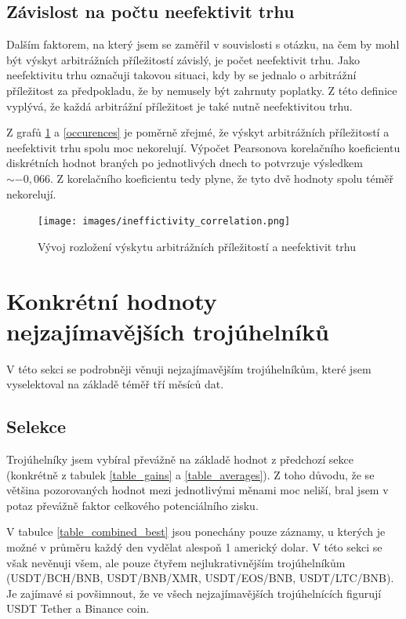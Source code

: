 \documentclass[thesis=B,czech]{FITthesis}[2019/03/21]
\begin{document}
\subsection{Závislost na počtu neefektivit trhu}
Dalším faktorem, na který jsem se zaměřil v souvislosti s otázku, na čem by mohl být výskyt arbitrážních příležitostí závislý, je počet neefektivit trhu. Jako neefektivitu trhu označuji takovou situaci, kdy by se jednalo o arbitrážní příležitost za předpokladu, že by nemusely být zahrnuty poplatky. Z této definice vyplývá, že každá arbitrážní příležitost je také nutně neefektivitou trhu.

Z grafů \ref{ineffictivity_correlation} a \ref{occurences} je poměrně zřejmé, že výskyt arbitrážních příležitostí a neefektivit trhu spolu moc nekorelují. Výpočet Pearsonova korelačního koeficientu diskrétních hodnot braných po jednotlivých dnech to potvrzuje výsledkem \(\sim-0,066\). Z korelačního koeficientu tedy plyne, že tyto dvě hodnoty spolu téměř nekorelují.

\begin{figure}\centering
	\texttt{[image: images/ineffictivity\_correlation.png]}
	\caption{Vývoj rozložení výskytu arbitrážních příležitostí a neefektivit trhu}\label{ineffictivity_correlation}
\end{figure}
\section{Konkrétní hodnoty nejzajímavějších trojúhelníků}
V této sekci se podrobněji věnuji nejzajímavějším trojúhelníkům, které jsem vyselektoval na základě téměř tří měsíců dat. 

\subsection{Selekce}
Trojúhelníky jsem vybíral převážně na základě hodnot z předchozí sekce (konkrétně z tabulek \ref{table_gains} a \ref{table_averages}). Z toho důvodu, že se většina pozorovaných hodnot mezi jednotlivými měnami moc neliší, bral jsem v potaz převážně faktor celkového potenciálního zisku.

V tabulce \ref{table_combined_best} jsou ponechány pouze záznamy, u kterých je možné v průměru každý den vydělat alespoň 1 americký dolar. V této sekci se však nevěnuji všem, ale pouze čtyřem nejlukrativnějším trojúhelníkům (USDT/BCH/BNB, USDT/BNB/XMR, USDT/EOS/BNB, USDT/LTC/BNB).
Je zajímavé si povšimnout, že ve všech nejzajímavějších trojúhelnících figurují USDT Tether a Binance coin.
\end{document}
